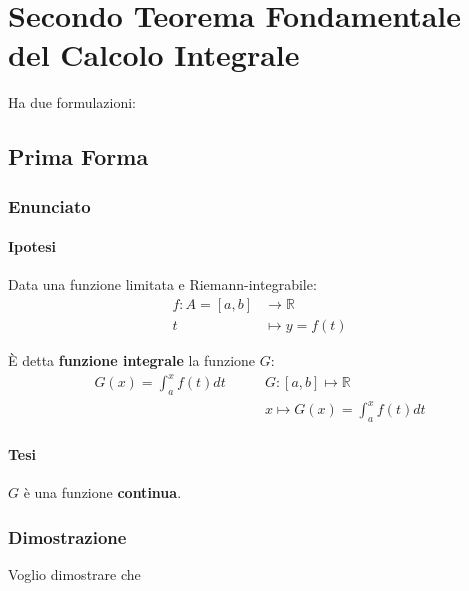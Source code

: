 \documentclass[../dimostrazioni]{subfiles}
\begin{document}
    \chapter{Secondo Teorema Fondamentale del Calcolo Integrale}
    \label{teoFondCalcoloIntegrale2}

    Ha due formulazioni:

    \section*{Prima Forma}

        \subsection*{Enunciato}

            \subsubsection*{Ipotesi}
        
                Data una funzione limitata e Riemann-integrabile:
                    \begin{align*}
                        f : A = [a, b] &\longrightarrow \mathbb{R}\\
                        t &\longmapsto y = f(t) 
                    \end{align*}

                    È detta \textbf{funzione integrale} la funzione \(G\):
                    \begin{align*}
                        G(x) = \int_{a}^{x} f(t) dt \qquad   &{G : [a, b] \longmapsto \mathbb{R}} \\
                        &{x \longmapsto G(x) = \int_{a}^{x} f(t) dt}
                    \end{align*}

            \subsubsection*{Tesi}

                \(G\) è una funzione \textbf{continua}.
            
        \subsection*{Dimostrazione}

            Voglio dimostrare che 
\end{document}
